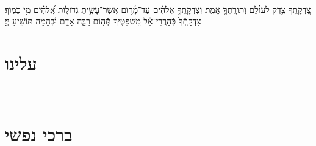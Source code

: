 \documentclass[twoside, openany, parskip=half, 11pt]{book}
\begin{document}
\zion

\modim

\shabboschanukah

\shabboshodos

\shabbossimshalom

\tachanunim

\\
צִ֭דְקָֽתְֿךָ צֶ֥דֶק לְֿעוֹ֗לָם וְֿתוֹרָֽתְֿךָ֥ אֱמֶֽת׃ וְצִדְקָֽתְֿךָ֥ אֱלֹהִ֗ים עַד־מָ֫ר֥וֹם אֲשֶׁר־עָשִׂ֥יתָ גְֿדוֹל֑וֹת אֱ֝לֹהִ֗ים מִ֣י כָמֽוֹךָ׃ צִדְקָֽתְֿךָ֙ כְּֽֿהַרֲרֵי־אֵ֗ל מִ֭שְׁפָּטֶיךָ תְּֿה֣וֹם רַבָּ֑ה אָדָ֥ם וּ֜בְהֵמָ֗ה תּוֹשִׁ֥יעַ יְיָ׃

\fullkaddish

\section*{ עלינו }

\aleinu

\\

\section[ברכי נפשי]{ ברכי נפשי }
\end{document}
